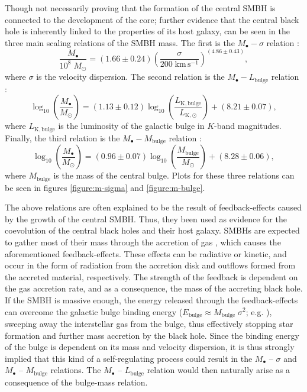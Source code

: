 \documentclass[english, twoside]{HYgradu}
\begin{document}
Though not necessarily proving that the formation of the central SMBH is connected to the development of the core; further evidence that the central black hole is inherently linked to the properties of its host galaxy, can be seen in the three main scaling relations of the SMBH mass. The first is the $M_\bullet - \sigma$ relation \citep{Ferrarese2005}:
\begin{equation}
\frac{M_\bullet}{10^8 \; M_\odot} = (1.66 \pm 0.24) \left( \frac{\sigma}{200 \; \mathrm{km \, s^{-1}}} \right)^{(4.86\pm0.43)}, \label{eq:m-sigma}
\end{equation}
where $\sigma$ is the velocity dispersion. The second relation is the $M_\bullet - L_\mathrm{bulge}$ relation \citep{Marconi2003}:
\begin{equation}
\log_{10} \left( \frac{M_\bullet}{M_\odot} \right) = (1.13 \pm 0.12) \log_{10} \left( \frac{L_\mathrm{K,bulge}}{L_\mathrm{K,\odot}} \right) + (8.21 \pm 0.07), \label{eq:m-l_bulge}
\end{equation}
where $L_\mathrm{K,bulge}$ is the luminosity of the galactic bulge in $K$-band magnitudes. Finally, the third relation is the $M_\bullet - M_\mathrm{bulge}$ relation \citep{Marconi2003}:
\begin{equation}
\log_{10} \left( \frac{M_\bullet}{M_\odot} \right) = (0.96 \pm 0.07) \log_{10} \left( \frac{M_\mathrm{bulge}}{M_\odot} \right) + (8.28 \pm 0.06), \label{eq:m-m_bulge}
\end{equation}
where $M_\mathrm{bulge}$ is the mass of the central bulge. Plots for these three relations can be seen in figures \ref{figure:m-sigma} and \ref{figure:m-bulge}. 

The above relations are often explained to be the result of feedback-effects caused by the growth of the central SMBH. Thus, they been used as evidence for the coevolution of the central black holes and their host galaxy. SMBHs are expected to gather most of their mass through the accretion of gas \citep{Soltan1982}, which causes the aforementioned feedback-effects. These effects can be radiative or kinetic, and occur in the form of radiation from the accretion disk and outflows formed from the accreted material, respectively. The strength of the feedback is dependent on the gas accretion rate, and as a consequence, the mass of the accreting black hole. If the SMBH is massive enough, the energy released through the feedback-effects can overcome the galactic bulge binding energy ($E_\mathrm{bulge} \approx M_\mathrm{bulge} \; \sigma^2$; e.g. \citealt{Fabian2012}), sweeping away the interstellar gas from the bulge, thus effectively stopping star formation and further mass accretion by the black hole. Since the binding energy of the bulge is dependent on its mass and velocity dispersion, it is thus strongly implied that this kind of a self-regulating process could result in the $M_\bullet$ – $\sigma$ and $M_\bullet$ – $M_\mathrm{bulge}$ relations. The $M_\bullet$ – $L_\mathrm{bulge}$ relation would then naturally arise as a consequence of the bulge-mass relation.
\end{document}
